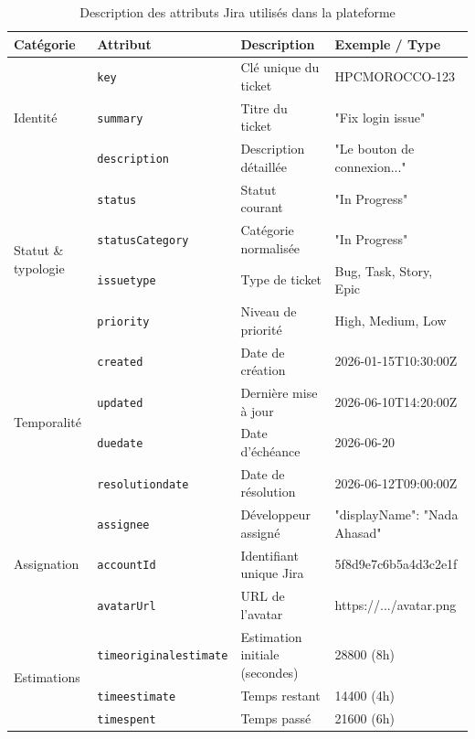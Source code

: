 \begin{table}[H]
	\scriptsize
	\renewcommand{\arraystretch}{1.3}
	\caption{Description des attributs Jira utilisés dans la plateforme}
	\begin{tabularx}{\textwidth}{@{} p{3cm} p{2.5cm} X p{3.3cm} @{}}
		\toprule
		\textbf{Catégorie} & \textbf{Attribut} & \textbf{Description} & \textbf{Exemple / Type} \\
		\midrule
		\multirow{3}{*}{Identité} 
		& \texttt{key} & Clé unique du ticket & HPCMOROCCO-123 \\
		& \texttt{summary} & Titre du ticket & "Fix login issue" \\
		& \texttt{description} & Description détaillée & "Le bouton de connexion..." \\
		
		\midrule
		\multirow{4}{*}{Statut \& typologie} 
		& \texttt{status} & Statut courant & "In Progress" \\
		& \texttt{statusCategory} & Catégorie normalisée & "In Progress" \\
		& \texttt{issuetype} & Type de ticket & Bug, Task, Story, Epic \\
		& \texttt{priority} & Niveau de priorité & High, Medium, Low \\
		
		\midrule
		\multirow{4}{*}{Temporalité} 
		& \texttt{created} & Date de création & 2026-01-15T10:30:00Z \\
		& \texttt{updated} & Dernière mise à jour & 2026-06-10T14:20:00Z \\
		& \texttt{duedate} & Date d’échéance & 2026-06-20 \\
		& \texttt{resolutiondate} & Date de résolution & 2026-06-12T09:00:00Z \\
		
		\midrule
		\multirow{3}{*}{Assignation} 
		& \texttt{assignee} & Développeur assigné & { "displayName": "Nada Ahasad" } \\
		& \texttt{accountId} & Identifiant unique Jira & 5f8d9e7c6b5a4d3c2e1f \\
		& \texttt{avatarUrl} & URL de l’avatar & https://.../avatar.png \\
		
		\midrule
		\multirow{3}{*}{Estimations} 
		& \texttt{timeoriginalestimate} & Estimation initiale (secondes) & 28800 (8h) \\
		& \texttt{timeestimate} & Temps restant & 14400 (4h) \\
		& \texttt{timespent} & Temps passé & 21600 (6h) \\
		

\end{tabularx}
\end{table}
